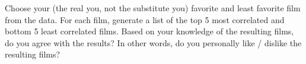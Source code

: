 Choose your (the real you, not the substitute you) favorite and
least favorite film from the data.  For each film, generate a list
of the top 5 most correlated and bottom 5 least correlated films.
Based on your knowledge of the resulting films, do you agree with
the results?  In other words, do you personally like / dislike
the resulting films?